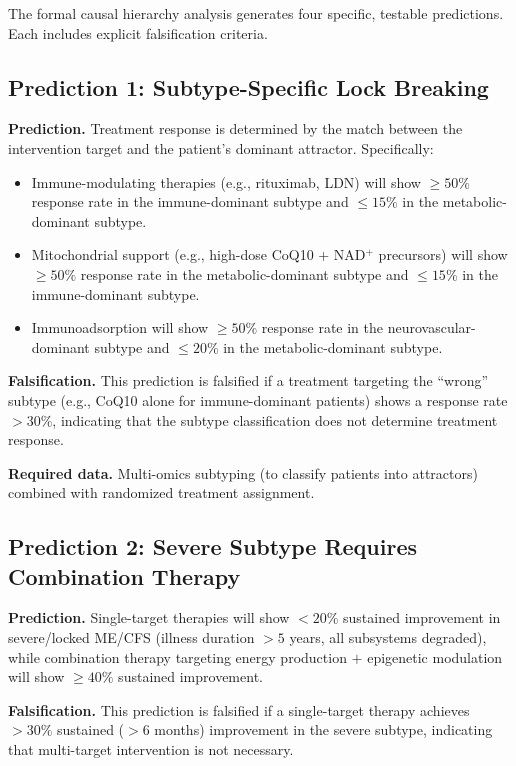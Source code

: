 The formal causal hierarchy analysis generates four specific, testable predictions. Each includes explicit falsification criteria.

\subsection{Prediction 1: Subtype-Specific Lock Breaking}
\label{sec:prediction-lock-breaking}

\textbf{Prediction.} Treatment response is determined by the match between the intervention target and the patient's dominant attractor. Specifically:
\begin{itemize}
    \item Immune-modulating therapies (e.g., rituximab, LDN) will show $\geq 50\%$ response rate in the immune-dominant subtype and $\leq 15\%$ in the metabolic-dominant subtype.
    \item Mitochondrial support (e.g., high-dose CoQ10 + NAD$^+$ precursors) will show $\geq 50\%$ response rate in the metabolic-dominant subtype and $\leq 15\%$ in the immune-dominant subtype.
    \item Immunoadsorption will show $\geq 50\%$ response rate in the neurovascular-dominant subtype and $\leq 20\%$ in the metabolic-dominant subtype.
\end{itemize}

\textbf{Falsification.} This prediction is falsified if a treatment targeting the ``wrong'' subtype (e.g., CoQ10 alone for immune-dominant patients) shows a response rate $> 30\%$, indicating that the subtype classification does not determine treatment response.

\textbf{Required data.} Multi-omics subtyping (to classify patients into attractors) combined with randomized treatment assignment.

\subsection{Prediction 2: Severe Subtype Requires Combination Therapy}
\label{sec:prediction-combination}

\textbf{Prediction.} Single-target therapies will show $< 20\%$ sustained improvement in severe/locked ME/CFS (illness duration $> 5$ years, all subsystems degraded), while combination therapy targeting energy production $+$ epigenetic modulation will show $\geq 40\%$ sustained improvement.

\textbf{Falsification.} This prediction is falsified if a single-target therapy achieves $> 30\%$ sustained ($> 6$ months) improvement in the severe subtype, indicating that multi-target intervention is not necessary.

